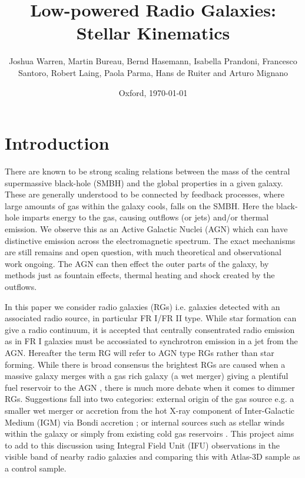 \documentclass[a4paper,fleqn,usenatbib,useAMS]{mnras}
\begin{document}
\title{Low-powered Radio Galaxies: Stellar Kinematics}
\author{Joshua Warren, Martin Bureau, Bernd Hasemann, Isabella Prandoni, Francesco Santoro, Robert Laing, Paola Parma, Hans de Ruiter and Arturo Mignano}
\date{Oxford, \today}


\maketitle


\section{Introduction}
	\label{sec:intro}
	There are known to be strong scaling relations between the mass of the central supermassive black-hole (SMBH) and the global properties in a given galaxy. These are generally understood to be connected by feedback processes, where large amounts of gas within the galaxy cools, falls on the SMBH. Here the black-hole imparts energy to the gas, causing outflows (or jets) and/or thermal emission. We observe this as an Active Galactic Nuclei (AGN) which can have distinctive emission across the electromagnetic spectrum. The exact mechanisms are still remains and open question, with much theoretical and observational work ongoing. The AGN can then effect the outer parts of the galaxy, by methods just as fountain effects, thermal heating and shock created by the outflows.

	In this paper we consider radio galaxies (RGs) i.e. galaxies detected with an associated radio source, in particular FR I/FR II type. While star formation can give a radio continuum, it is accepted that centrally consentrated radio emission as in FR I galaxies must be accossiated to synchrotron emission in a jet from the AGN. Hereafter the term RG will refer to AGN type RGs rather than star forming.	While there is broad consensus the brightest RGs are caused when a massive galaxy merges with a gas rich galaxy (a wet merger) giving a plentiful fuel reservoir to the AGN \cite{Baum1992}, there is much more debate when it comes to dimmer RGs. Suggestions fall into two categories: external origin of the gas source e.g. a smaller wet merger or accretion from the hot X-ray component of Inter-Galactic Medium (IGM) via Bondi accretion \cite{Allen2006}; or internal sources such as stellar winds within the galaxy or simply from existing cold gas reservoirs \cite{Prandoni2010}. This project aims to add to this discussion using Integral Field Unit (IFU) observations in the visible band of nearby radio galaxies and comparing this with Atlas-3D sample \cite{Cappellari2011} as a control sample.
\end{document}
